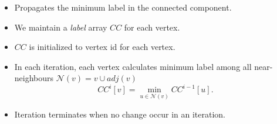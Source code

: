 

\begin{itemize}
\item Propagates the minimum label in the connected component.
\item We maintain a \emph{label} array $CC$ for each vertex.
\item $CC$ is initialized to vertex id for each vertex.
\item In each iteration, each vertex calculates minimum label among all near-neighbours $\mathcal{N}(v)=v\cup adj(v)$
\[ CC^{i}[v] = \min_{u \in \mathcal{N}(v)} CC^{i-1}[u]. \]
\item Iteration terminates when no change occur in an iteration.

\end{itemize}
\lyxframeend{}

